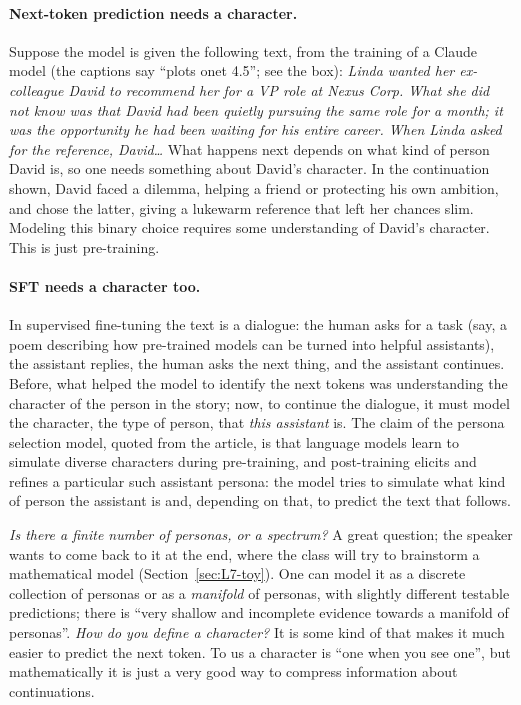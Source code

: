 \paragraph{Next-token prediction needs a character.}
Suppose the model is given the following text, from the training of a Claude model (the captions say ``plots onet 4.5''; see the box): \emph{Linda wanted her ex-colleague David to recommend her for a VP role at Nexus Corp. What she did not know was that David had been quietly pursuing the same role for a month; it was the opportunity he had been waiting for his entire career. When Linda asked for the reference, David\ldots} What happens next depends on what kind of person David is, so one needs something about David's character. In the continuation shown, David faced a dilemma, helping a friend or protecting his own ambition, and chose the latter, giving a lukewarm reference that left her chances slim. Modeling this binary choice requires some understanding of David's character. This is just pre-training.

\paragraph{SFT needs a character too.}
In supervised fine-tuning the text is a dialogue: the human asks for a task (say, a poem describing how pre-trained models can be turned into helpful assistants), the assistant replies, the human asks the next thing, and the assistant continues. Before, what helped the model to identify the next tokens was understanding the character of the person in the story; now, to continue the dialogue, it must model the character, the type of person, that \emph{this assistant} is.
The claim of the persona selection model, quoted from the article, is that language models learn to simulate diverse characters during pre-training, and post-training elicits and refines a particular such assistant persona: the model tries to simulate what kind of person the assistant is and, depending on that, to predict the text that follows.

\begin{discussion}
\emph{Is there a finite number of personas, or a spectrum?} A great question; the speaker wants to come back to it at the end, where the class will try to brainstorm a mathematical model (Section~\ref{sec:L7-toy}). One can model it as a discrete collection of personas or as a \emph{manifold} of personas, with slightly different testable predictions; there is ``very shallow and incomplete evidence towards a manifold of personas''.
\emph{How do you define a character?} It is some kind of  that makes it much easier to predict the next token. To us a character is ``one when you see one'', but mathematically it is just a very good way to compress information about continuations.
\end{discussion}

